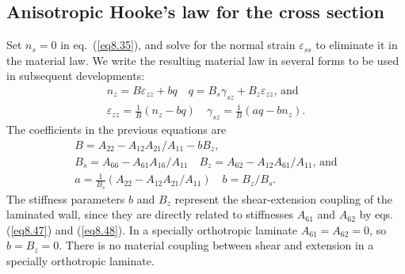 \documentclass{AeroStructure-ERJohnson}
\begin{document}
\subsection{Anisotropic Hooke's law for the cross section}\label{sec8.2.1}

Set $n_{s}=0$ in eq.~(\ref{eq8.35}), and solve for the normal
strain $\varepsilon_{ss}$ to eliminate it in the material law. We
write the resulting material law in several forms to be used in
subsequent developments:
\begin{gather}
n_{z}=B \varepsilon_{z z}+b q \quad q=B_{s} \gamma_{s z}+B_{z}
\varepsilon_{z z}\mbox{, and}\label{eq8.44}\\
\varepsilon_{z z}=\frac{1}{B}\left(n_{z}-b q\right) \quad
\gamma_{s z}=\frac{1}{B}\left(a q-b n_{z}\right).\label{eq8.45}
\end{gather}
The coefficients in the previous equations are
\begin{gather}
B=A_{22}-A_{12} A_{21}/ A_{11}-b B_{z},\label{eq8.46}\\
B_{s}=A_{66}-A_{61} A_{16}/ A_{11} \quad B_{z}=A_{62}-A_{12}
A_{61}/ A_{11}\mbox{, and}\label{eq8.47}\\
a=\frac{1}{B_{s}}\left(A_{22}-A_{12} A_{21}/ A_{11}\right) \quad
b=B_{z}/ B_{s}.\label{eq8.48}
\end{gather}
The stiffness parameters $b$ and $B_{z}$ represent the
shear-extension coupling of the laminated wall, since they are
directly related to stiffnesses $A_{61}$ and $A_{62}$ by eqs.
(\ref{eq8.47}) and (\ref{eq8.48}). In a specially orthotropic
laminate $A_{61}={A_{62}=0}$, so $b={B_{z}=0}$. There is no material
coupling between shear and extension in a specially orthotropic
laminate.
\end{document}
